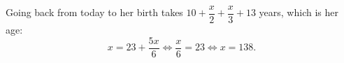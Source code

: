 Going back from today to her birth takes $10+\dfrac x2+\dfrac x3+13$ years, which is her age:
\[x=23+\dfrac{5x}{6}\iff\dfrac x6=23\iff x=\boxed{138}.\]
